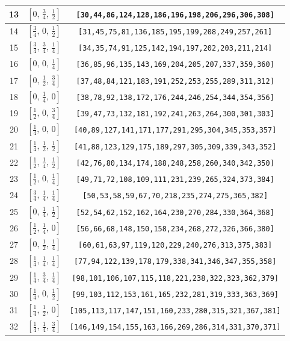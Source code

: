 \documentclass[fleqn,8pt]{jsarticle}
\begin{document}
\begin{longtable}{ccc}
13 & $\left[ 0,\, \frac{3}{4},\, \frac{1}{2} \right]$ & {\tt [30,44,86,124,128,186,196,198,206,296,306,308]} \\ \hline
14 & $\left[ \frac{3}{4},\, 0,\, \frac{1}{2} \right]$ & {\tt [31,45,75,81,136,185,195,199,208,249,257,261]} \\ \hline
15 & $\left[ \frac{3}{4},\, \frac{3}{4},\, \frac{1}{4} \right]$ & {\tt [34,35,74,91,125,142,194,197,202,203,211,214]} \\ \hline
16 & $\left[ 0,\, 0,\, \frac{1}{4} \right]$ & {\tt [36,85,96,135,143,169,204,205,207,337,359,360]} \\ \hline
17 & $\left[ 0,\, \frac{1}{2},\, \frac{3}{4} \right]$ & {\tt [37,48,84,121,183,191,252,253,255,289,311,312]} \\ \hline
18 & $\left[ 0,\, \frac{1}{4},\, 0 \right]$ & {\tt [38,78,92,138,172,176,244,246,254,344,354,356]} \\ \hline
19 & $\left[ \frac{1}{2},\, 0,\, \frac{3}{4} \right]$ & {\tt [39,47,73,132,181,192,241,263,264,300,301,303]} \\ \hline
20 & $\left[ \frac{1}{4},\, 0,\, 0 \right]$ & {\tt [40,89,127,141,171,177,291,295,304,345,353,357]} \\ \hline
21 & $\left[ \frac{1}{4},\, \frac{1}{2},\, \frac{1}{2} \right]$ & {\tt [41,88,123,129,175,189,297,305,309,339,343,352]} \\ \hline
22 & $\left[ \frac{1}{2},\, \frac{1}{4},\, \frac{1}{2} \right]$ & {\tt [42,76,80,134,174,188,248,258,260,340,342,350]} \\ \hline
23 & $\left[ \frac{1}{2},\, 0,\, \frac{1}{4} \right]$ & {\tt [49,71,72,108,109,111,231,239,265,324,373,384]} \\ \hline
24 & $\left[ \frac{3}{4},\, \frac{1}{4},\, \frac{1}{4} \right]$ & {\tt [50,53,58,59,67,70,218,235,274,275,365,382]} \\ \hline
25 & $\left[ 0,\, \frac{1}{4},\, \frac{1}{2} \right]$ & {\tt [52,54,62,152,162,164,230,270,284,330,364,368]} \\ \hline
26 & $\left[ \frac{1}{2},\, \frac{1}{4},\, 0 \right]$ & {\tt [56,66,68,148,150,158,234,268,272,326,366,380]} \\ \hline
27 & $\left[ 0,\, \frac{1}{2},\, \frac{1}{4} \right]$ & {\tt [60,61,63,97,119,120,229,240,276,313,375,383]} \\ \hline
28 & $\left[ \frac{1}{4},\, \frac{1}{4},\, \frac{1}{4} \right]$ & {\tt [77,94,122,139,178,179,338,341,346,347,355,358]} \\ \hline
29 & $\left[ \frac{1}{4},\, \frac{3}{4},\, \frac{1}{4} \right]$ & {\tt [98,101,106,107,115,118,221,238,322,323,362,379]} \\ \hline
30 & $\left[ \frac{1}{4},\, 0,\, \frac{1}{2} \right]$ & {\tt [99,103,112,153,161,165,232,281,319,333,363,369]} \\ \hline
31 & $\left[ \frac{1}{4},\, \frac{1}{2},\, 0 \right]$ & {\tt [105,113,117,147,151,160,233,280,315,321,367,381]} \\ \hline
32 & $\left[ \frac{1}{4},\, \frac{1}{4},\, \frac{3}{4} \right]$ & {\tt [146,149,154,155,163,166,269,286,314,331,370,371]} \\
\end{longtable}
\end{document}
